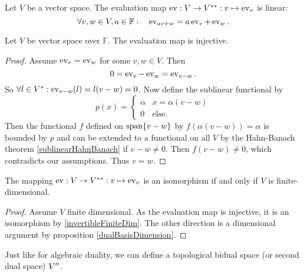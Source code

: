 \begin{lemma}
Let $V$ be a vector space. The evaluation map $\operatorname{ev}: V\to {V}^{**}: v\mapsto \operatorname{ev}_v$ is linear:
\[ \forall v,w\in V, a\in\mathbb{F}: \quad \operatorname{ev}_{av + w} = a\operatorname{ev}_v + \operatorname{ev}_w. \]
\end{lemma}
\begin{lemma}
Let $V$ be vector space over $\mathbb{F}$. The evaluation map is injective.
\end{lemma}
\begin{proof}
Assume $\operatorname{ev}_v = \operatorname{ev}_w$ for some $v,w\in V$. Then
\[ 0 = \operatorname{ev}_v - \operatorname{ev}_w  = \operatorname{ev}_{v-w}. \]
So $\forall l\in {V}^*: \operatorname{ev}_{v-w}(l) = l(v-w) = 0$. Now define the sublinear functional by
\[ p(x) = \begin{cases}
\alpha & x = \alpha(v-w) \\
0 & \text{else}.
\end{cases} \]
Then the functional $f$ defined on $\operatorname{span}\{v-w\}$ by $f(\alpha(v-w)) = \alpha$ is bounded by $p$ and can be extended to a functional on all $V$ by the Hahn-Banach theorem \ref{sublinearHahnBanach} if $v-w\neq 0$. Then $f(v-w) \neq 0$, which contradicts our assumptions. Thus $v=w$.
\end{proof}

\begin{proposition}
The mapping $\operatorname{ev}: V\to {V}^{**}: v\mapsto \operatorname{ev}_v$ is an isomorphism \textup{if and only if} $V$ is finite-dimensional.
\end{proposition}
\begin{proof}
Assume $V$ finite dimensional. As the evaluation map is injective, it is an isomorphism by \ref{invertibleFiniteDim}.
The other direction is a dimensional argument by proposition \ref{dualBasisDimension}.
\end{proof}


Just like for algebraic duality, we can define a topological bidual space (or second dual space) ${V}^{\prime\prime}$.

